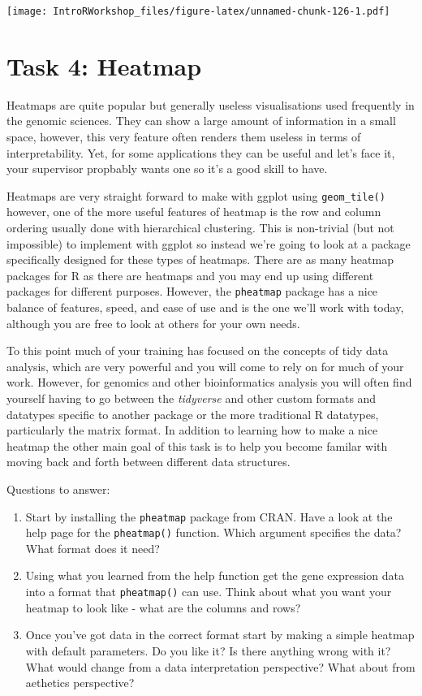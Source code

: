 \documentclass[
]{book}
\providecommand{\tightlist}{%
  \setlength{\itemsep}{0pt}\setlength{\parskip}{0pt}}
\begin{document}
\texttt{[image: IntroRWorkshop\_files/figure-latex/unnamed-chunk-126-1.pdf]}

\hypertarget{task-4-heatmap}{%
\section*{Task 4: Heatmap}\label{task-4-heatmap}}

Heatmaps are quite popular but generally useless visualisations used frequently in the genomic sciences. They can show a large amount of information in a small space, however, this very feature often renders them useless in terms of interpretability. Yet, for some applications they can be useful and let's face it, your supervisor propbably wants one so it's a good skill to have.

Heatmaps are very straight forward to make with ggplot using \texttt{geom\_tile()} however, one of the more useful features of heatmap is the row and column ordering usually done with hierarchical clustering. This is non-trivial (but not impossible) to implement with ggplot so instead we're going to look at a package specifically designed for these types of heatmaps. There are as many heatmap packages for R as there are heatmaps and you may end up using different packages for different purposes. However, the \texttt{pheatmap} package has a nice balance of features, speed, and ease of use and is the one we'll work with today, although you are free to look at others for your own needs.

To this point much of your training has focused on the concepts of tidy data analysis, which are very powerful and you will come to rely on for much of your work. However, for genomics and other bioinformatics analysis you will often find yourself having to go between the \emph{tidyverse} and other custom formats and datatypes specific to another package or the more traditional R datatypes, particularly the matrix format. In addition to learning how to make a nice heatmap the other main goal of this task is to help you become familar with moving back and forth between different data structures.

Questions to answer:

\begin{enumerate}
\def\labelenumi{\arabic{enumi}.}
\tightlist
\item
  Start by installing the \texttt{pheatmap} package from CRAN. Have a look at the help page for the \texttt{pheatmap()} function. Which argument specifies the data? What format does it need?
\item
  Using what you learned from the help function get the gene expression data into a format that \texttt{pheatmap()} can use. Think about what you want your heatmap to look like - what are the columns and rows?
\item
  Once you've got data in the correct format start by making a simple heatmap with default parameters. Do you like it? Is there anything wrong with it? What would change from a data interpretation perspective? What about from aethetics perspective?
\end{enumerate}
\end{document}
